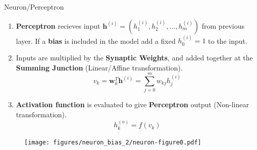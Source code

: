\documentclass[]{beamer}
\begin{document}
\begin{frame}[fragile]
   {Neuron/Perceptron}
   \scriptsize
   \begin{minipage}{0.475 \linewidth}
      \begin{enumerate}
         \item
            \textbf{Perceptron} recieves input $\boldsymbol{h}^{(i)} = \left( h^{(i)}_1, h^{(i)}_2, \dots, h^{(i)}_m \right)$ from previous layer.
            If a \textbf{bias} is included in the model add a fixed $h^{(i)}_0 = 1$ to the input.
         \item
            Inputs are multiplied by the \textbf{Synaptic Weights},
            and added together at the \textbf{Summing Junction} (Linear/Affine transformation).
            \begin{equation*}
               v_k = \boldsymbol{w}^T_k \boldsymbol{h}^{(i)} = \sum_{j=0}^m w_{kj} h^{(i)}_j
            \end{equation*}
         \item
            \textbf{Activation function} is evaluated to give \textbf{Perceptron} output (Non-linear transformation).
            \begin{equation*}
               h^{(o)}_k = f \left( v_k \right)
            \end{equation*}
      \end{enumerate}

   \end{minipage}
   \hspace{-0.2cm}
   \begin{minipage}{0.475 \linewidth}
      \vspace{-0,5cm}
      \begin{figure}
         \centering
         \texttt{[image: figures/neuron\_bias\_2/neuron-figure0.pdf]}
      \end{figure}
   \end{minipage}
\end{frame}
\end{document}
